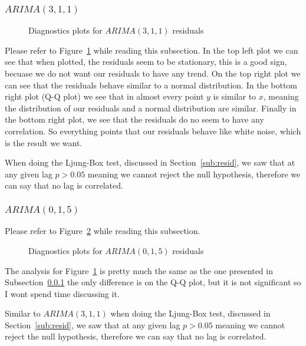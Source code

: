 \documentclass[journal]{IEEEtran}
\begin{document}
\subsubsection{$ARIMA(3,1,1)$}\label{sub:31}

\begin{figure}[htbp]
  \centering
  
    \caption{Diagnostics plots for $ARIMA(3,1,1)$ residuals}
    \label{fig:diag-31}
\end{figure}

Please refer to Figure~\ref{fig:diag-31} while reading this subsection. In the
top left plot we can see that when plotted, the residuals seem to be
stationary, this is a good sign, becuase we do not want our residuals to have
any trend. On the top right plot we can see that the residuals behave similar
to a normal distribution. In the bottom right plot (Q-Q plot) we see that in
almost every point $y$ is similar to $x$, meaning the distribution of our
residuals and a normal distribution are similar. Finally in the bottom right
plot, we see that the residuals do no seem to have any correlation. So
everything points that our residuals behave like white noise, which is the
result we want.

When doing the Ljung-Box test, discussed in Section~\ref{sub:resid}, we saw
that at any given lag $p > 0.05$ meaning we cannot reject the null hypothesis,
therefore we can say that no lag is correlated.

\subsubsection{$ARIMA(0,1,5)$}

Please refer to Figure~\ref{fig:diag-05} while reading this subsection.
\begin{figure}[htbp]
  \centering
  
    \caption{Diagnostics plots for $ARIMA(0,1,5)$ residuals}
    \label{fig:diag-05}
\end{figure}

The analysis for Figure~\ref{fig:diag-31} is pretty much the same as the one
presented in Subsection~\ref{sub:31} the only difference is on the Q-Q plot,
but it is not significant so I wont spend time discussing it.

Similar to $ARIMA(3,1,1)$ when doing the Ljung-Box test, discussed in
Section~\ref{sub:resid}, we saw that at any given lag $p > 0.05$ meaning we
cannot reject the null hypothesis, therefore we can say that no lag is
correlated.
\end{document}
